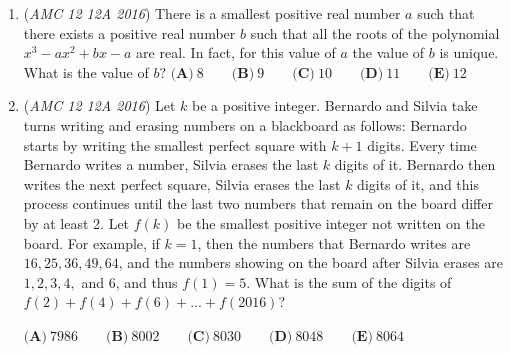\begin{enumerate}
 $\textbf{(A)}\ \dfrac{1}{6}\qquad\textbf{(B)}\ \dfrac{1}{3}\qquad\textbf{(C)}\ \dfrac{1}{2}\qquad\textbf{(D)}\ \dfrac{2}{3}\qquad\textbf{(E)}\ \dfrac{5}{6}$


	\item (\textit{AMC 12 12A 2016}) There is a smallest positive real number $a$ such that there exists a positive real number $b$ such that all the roots of the polynomial $x^3-ax^2+bx-a$ are real. In fact, for this value of $a$ the value of $b$ is unique. What is the value of $b?$
$\textbf{(A)}\ 8\qquad\textbf{(B)}\ 9\qquad\textbf{(C)}\ 10\qquad\textbf{(D)}\ 11\qquad\textbf{(E)}\ 12$


	\item (\textit{AMC 12 12A 2016}) Let $k$ be a positive integer. Bernardo and Silvia take turns writing and erasing numbers on a blackboard as follows: Bernardo starts by writing the smallest perfect square with $k+1$ digits. Every time Bernardo writes a number, Silvia erases the last $k$ digits of it. Bernardo then writes the next perfect square, Silvia erases the last $k$ digits of it, and this process continues until the last two numbers that remain on the board differ by at least 2. Let $f(k)$ be the smallest positive integer not written on the board. For example, if $k = 1$, then the numbers that Bernardo writes are $16, 25, 36, 49, 64$, and the numbers showing on the board after Silvia erases are $1, 2, 3, 4,$ and $6$, and thus $f(1) = 5$. What is the sum of the digits of $f(2) + f(4)+ f(6) + ... + f(2016)$?


 $\textbf{(A)}\ 7986\qquad\textbf{(B)}\ 8002\qquad\textbf{(C)}\ 8030\qquad\textbf{(D)}\ 8048\qquad\textbf{(E)}\ 8064$


\end{enumerate}